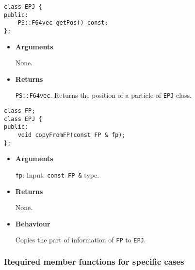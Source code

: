 
\begin{screen}
\begin{verbatim}
class EPJ {
public:
    PS::F64vec getPos() const;
};
\end{verbatim}
\end{screen}

\begin{itemize}

\item {\bf Arguments}

  None.
  
\item {\bf Returns}

  \texttt{PS::F64vec}.
  Returns the position of a particle of \texttt{EPJ} class.

\end{itemize}


\begin{screen}
\begin{verbatim}
class FP;
class EPJ {
public:
    void copyFromFP(const FP & fp);
};
\end{verbatim}
\end{screen}

\begin{itemize}

\item {\bf Arguments}

  \texttt{fp}: Input. \texttt{const FP \&} type.

\item {\bf Returns}

  None.
  
\item {\bf Behaviour}

  Copies the part of information of \texttt{FP} to \texttt{EPJ}.

\end{itemize}

\subsubsection{Required member functions for specific cases}


